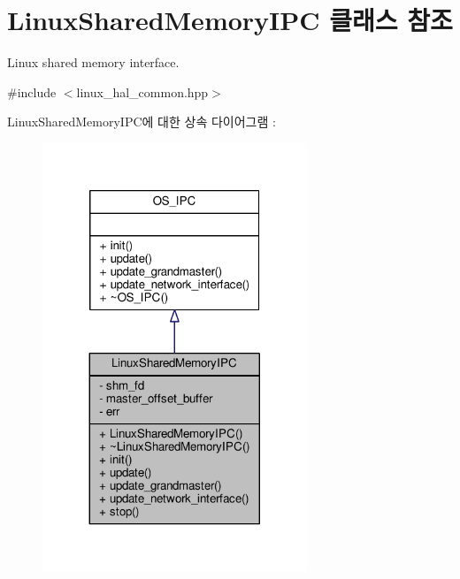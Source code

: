 \hypertarget{class_linux_shared_memory_i_p_c}{}\section{Linux\+Shared\+Memory\+I\+PC 클래스 참조}
\label{class_linux_shared_memory_i_p_c}


Linux shared memory interface.  




{\ttfamily \#include $<$linux\+\_\+hal\+\_\+common.\+hpp$>$}



Linux\+Shared\+Memory\+I\+P\+C에 대한 상속 다이어그램 \+: 
\nopagebreak
\begin{figure}[H]
\begin{center}
\leavevmode
\includegraphics[width=224pt]{class_linux_shared_memory_i_p_c__inherit__graph}
\end{center}
\end{figure}


